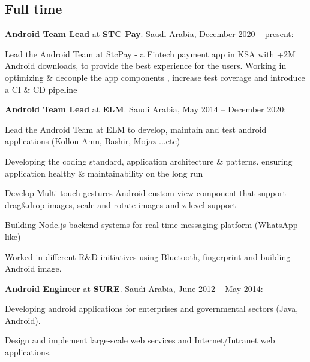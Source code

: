 \documentclass[letterpaper]{article}
\renewenvironment{itemize}{
  \begin{list}{}{
    \setlength{\leftmargin}{1.5em}
  }
}{
  \end{list}
}
\begin{document}
\subsection*{Full time}
\begin{itemize}

\item \textbf{Android Team Lead} at \textbf{STC Pay}.  Saudi Arabia, December 2020 -- present:
\begin{itemize}
Lead the Android Team at StcPay - a Fintech payment app in KSA with +2M Android downloads, to provide the best experience for the users. Working in optimizing  \& decouple the app components , increase test coverage and introduce a CI \& CD pipeline
\end{itemize}

\item \textbf{Android Team Lead} at \textbf{ELM}.  Saudi Arabia, May 2014 -- December 2020:
\begin{itemize}
\item Lead the Android Team at ELM to develop, maintain and test android applications  (Kollon-Amn, Bashir, Mojaz ...etc)
\item Developing the coding standard,  application architecture \& patterns. ensuring application healthy \& maintainability on the long run
\item Develop Multi-touch gestures Android custom view component that support drag\&drop images, scale and rotate images and z-level support
\item Building Node.js backend systems for real-time messaging platform (WhatsApp-like)
\item Worked in different R\&D initiatives using Bluetooth, fingerprint and building Android image.
\end{itemize}

\item \textbf{Android Engineer} at \textbf{SURE}.  Saudi Arabia, June 2012 -- May 2014:
\begin{itemize}
\item Developing android applications for enterprises and governmental sectors (Java, Android).
\item Design and implement large-scale web services and Internet/Intranet web applications.
\end{itemize}


\end{itemize}
\end{document}
